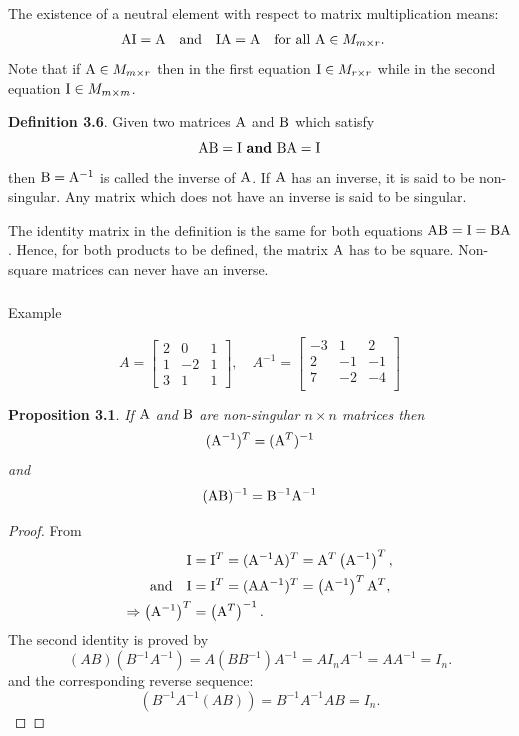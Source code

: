 \documentclass[
  letterpaper,
  DIV=11,
  numbers=noendperiod]{scrartcl}
\makeatletter
\let\oldsubparagraph\subparagraph
\renewcommand{\subparagraph}{
    \@ifstar
      \xxxSubParagraphStar
      \xxxSubParagraphNoStar
  }
\newcommand{\xxxSubParagraphStar}[1]{\oldsubparagraph*{#1}\mbox{}}
\newcommand{\xxxSubParagraphNoStar}[1]{\oldsubparagraph{#1}\mbox{}}
\theoremstyle{remark}
\makeatother
\begin{document}
The existence of a neutral element with respect to matrix multiplication
means: \[\begin{aligned}
{\rm A} {\rm I} & = {\rm A}  \quad \mbox{and} \quad  {\rm I}  {\rm A} = {\rm A}  \quad \mbox{for all} \ {\rm A} \in M_ {m\times r}.
\end{aligned}\] Note that if \({\rm A} \in M_{m\times r}\) then in the
first equation \({\rm I}\in M_{r\times r}\) while in the second equation
\({\rm I}\in M_{m\times m}\).

\textbf{Definition 3.6}. Given two matrices \({\rm A}\) and \({\rm B}\)
which satisfy
\[{\rm A} {\rm B} =  {\rm I}  \ \mbox{\bf and}  \  {\rm B}  {\rm A} = {\rm I}\]
then \({\rm B} = {\rm A}^{-1}\) is called the inverse of \({\rm A}\). If
\({\rm A}\) has an inverse, it is said to be non-singular. Any matrix
which does not have an inverse is said to be singular.

The identity matrix in the definition is the same for both equations
\({\rm A} {\rm B}  =   {\rm I} = {\rm B} {\rm A}\). Hence, for both
products to be defined, the matrix \({\rm A}\) has to be square.
Non-square matrices can never have an inverse.

\subparagraph{Example}\label{example-2}

\[A=\left[ \begin{array}{ccc}
 2 & 0 & 1 \\
 1 & {-2} & 1 \\
 3 & 1 & 1 
\end{array}  \right], \quad 
A^{-1}=\left[ \begin{array}{ccc}
 {-3} & 1 & 2 \\
 2 & {-1} & {-1} \\
 7 & {-2} & {-4} \\
\end{array}  \right]\]

\textbf{Proposition 3.1}. \emph{If \({\rm A}\) and \({\rm B}\) are
non-singular \(n\times n\) matrices then
\[({\rm A}^{-1})^T  =  ({\rm A}^T)^{-1}\] and
\[({\rm A}{\rm B})^{-1}={\rm B}^{-1}{\rm A}^{-1}\]}

\begin{proof}
From \[\begin{aligned}
{\rm I} & =   {\rm I}^T =  ({\rm A}^{-1}{\rm A})^T  =  {\rm A}^T\left({\rm A}^{-1}\right)^{T} , \\
\mbox{and} \quad {\rm I} & =   {\rm I}^T =  ({\rm A} {\rm A}^{-1})^T  = \left( {\rm A}^{-1}\right)^{T} {\rm A}^T , \\ 
\Rightarrow \left({\rm A}^{-1}\right)^T  & = \left({\rm A}^T\right)^{-1} .
\end{aligned}\] The second identity is proved by
\[(AB)(B^{-1}A^{-1})=A(BB^{-1})A^{-1}=AI_n A^{-1}=AA^{-1}=I_n .\] and
the corresponding reverse sequence:
\[(B^{-1}A^{-1}(AB))=B^{-1}A^{-1}AB=I_n .\]~◻
\end{proof}
\end{document}
